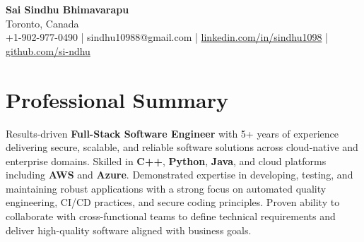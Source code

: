 \documentclass[letterpaper,11pt]{article}
\begin{document}
\begin{center}
  {\Large \textbf{Sai Sindhu Bhimavarapu}} \\
  Toronto, Canada \\
  +1-902-977-0490 \enspace | \enspace sindhu10988@gmail.com \enspace | \enspace \href{https://www.linkedin.com/in/sindhu1098/}{linkedin.com/in/sindhu1098} \enspace | \enspace \href{https://github.com/si-ndhu}{github.com/si-ndhu}
\end{center}

\section{Professional Summary}
  \begin{itemize}[leftmargin=0.15in, label={}]
    \small{\item{
     Results-driven \textbf{Full-Stack Software Engineer} with 5+ years of experience delivering secure, scalable, and reliable software solutions across cloud-native and enterprise domains. Skilled in \textbf{C++}, \textbf{Python}, \textbf{Java}, and cloud platforms including \textbf{AWS} and \textbf{Azure}. Demonstrated expertise in developing, testing, and maintaining robust applications with a strong focus on automated quality engineering, CI/CD practices, and secure coding principles. Proven ability to collaborate with cross-functional teams to define technical requirements and deliver high-quality software aligned with business goals.
    }}
  \end{itemize}
\vspace{-16pt}

\end{document}
